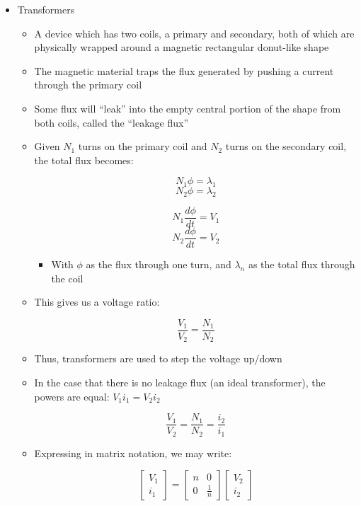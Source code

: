 \begin{itemize}

  \item Transformers

    \begin{itemize}

      \item A device which has two coils, a primary and secondary, both of which are physically wrapped around a magnetic rectangular donut-like shape

      \item The magnetic material traps the flux generated by pushing a current through the primary coil

      \item Some flux will ``leak'' into the empty central portion of the shape from both coils, called the ``leakage flux''

      \item Given $N_1$ turns on the primary coil and $N_2$ turns on the secondary coil, the total flux becomes:

        $$N_1\phi=\lambda_1$$
        $$N_2\phi=\lambda_2$$

        $$N_1\frac{d\phi}{dt}=V_1$$
        $$N_2\frac{d\phi}{dt}=V_2$$

        \begin{itemize}

          \item With $\phi$ as the flux through one turn, and $\lambda_n$ as the total flux through the coil

        \end{itemize}

      \item This gives us a voltage ratio:

        $$\frac{V_1}{V_2}=\frac{N_1}{N_2}$$

      \item Thus, transformers are used to step the voltage up/down

      \item In the case that there is no leakage flux (an ideal transformer), the powers are equal: $V_1i_1=V_2i_2$

        $$\frac{V_1}{V_2}=\frac{N_1}{N_2}=\frac{i_2}{i_1}$$

      \item Expressing in matrix notation, we may write:

        $$\left[ \begin{matrix} V_1\\i_1 \end{matrix} \right]=\left[ \begin{matrix} n & 0\\ 0 & \frac{1}{n} \end{matrix}\right]\left[ \begin{matrix} V_2\\ i_2\end{matrix} \right]$$


\end{itemize}
\end{itemize}
